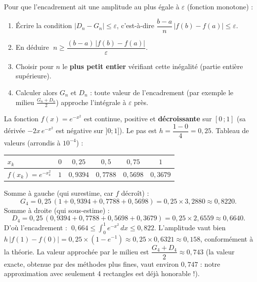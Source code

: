 \documentclass[11pt]{article}
\begin{document}
\begin{methode}
Pour que l'encadrement ait une amplitude au plus égale à $\varepsilon$ (fonction monotone) :
\begin{enumerate}
\item Écrire la condition $|D_n-G_n|\le\varepsilon$, c'est-à-dire $\dfrac{b-a}{n}\,|f(b)-f(a)|\le\varepsilon$.
\item En déduire $\; n \ge \dfrac{(b-a)\,|f(b)-f(a)|}{\varepsilon}$.
\item Choisir pour $n$ le \textbf{plus petit entier} vérifiant cette inégalité (partie entière supérieure).
\item Calculer alors $G_n$ et $D_n$ : toute valeur de l'encadrement (par exemple le milieu $\frac{G_n+D_n}{2}$) approche l'intégrale à $\varepsilon$ près.
\end{enumerate}
\end{methode}

\begin{exemplebox}[Encadrement de $\displaystyle\int_0^1 e^{-x^2}\,dx$ avec $n=4$]
La fonction $f(x)=e^{-x^2}$ est continue, positive et \textbf{décroissante} sur $[0\,;1]$ (sa dérivée $-2x\,e^{-x^2}$ est négative sur $]0;1]$). Le pas est $h=\dfrac{1-0}{4}=0{,}25$. Tableau de valeurs (arrondis à $10^{-4}$) :
\begin{center}
\begin{tabular}{|l|c|c|c|c|c|}
\hline
\rowcolor{popblueL} $x_k$ & $0$ & $0{,}25$ & $0{,}5$ & $0{,}75$ & $1$ \\
\hline
$f(x_k)=e^{-x_k^2}$ & $1$ & $0{,}9394$ & $0{,}7788$ & $0{,}5698$ & $0{,}3679$ \\
\hline
\end{tabular}
\end{center}
Somme à gauche (qui surestime, car $f$ décroît) :
\[ G_4 = 0{,}25\,(1+0{,}9394+0{,}7788+0{,}5698) = 0{,}25\times 3{,}2880 \approx 0{,}8220. \]
Somme à droite (qui sous-estime) :
\[ D_4 = 0{,}25\,(0{,}9394+0{,}7788+0{,}5698+0{,}3679) = 0{,}25\times 2{,}6559 \approx 0{,}6640. \]
D'où l'encadrement : $\; 0{,}664 \le \displaystyle\int_0^1 e^{-x^2}\,dx \le 0{,}822$.
L'amplitude vaut bien $h\,|f(1)-f(0)| = 0{,}25\times(1-e^{-1}) \approx 0{,}25\times 0{,}6321 \approx 0{,}158$, conformément à la théorie. La valeur approchée par le milieu est $\dfrac{G_4+D_4}{2}\approx 0{,}743$ (la valeur exacte, obtenue par des méthodes plus fines, vaut environ $0{,}747$ : notre approximation avec seulement 4 rectangles est déjà honorable !).
\end{exemplebox}
\end{document}
